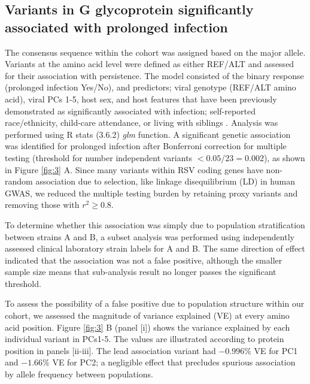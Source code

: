 \documentclass{article} %
\begin{document}
\subsection{Variants in G glycoprotein significantly associated with prolonged infection}
The consensus sequence within the cohort was assigned based on the major allele.
Variants at the amino acid level were defined as either REF/ALT and assessed for their association with persistence.
The model consisted of 
the binary response (prolonged infection Yes/No),
and predictors; viral genotype (REF/ALT amino acid), viral PCs 1-5, host sex, and host features that have been previously demonstrated as significantly associated with infection;
self-reported race/ethnicity, child-care attendance, or living with siblings
\cite{hall1976respiratory}.
Analysis was performed using R stats (3.6.2) \textit{glm} function. 
A significant genetic association was identified for prolonged infection after Bonferroni correction for multiple testing (threshold for number independent variants $< 0.05/23 = 0.002$), 
as shown in 
Figure \ref{fig:3} A. 
Since many variants within RSV coding genes have non-random association due to selection, like linkage disequilibrium (LD) in human GWAS, 
we reduced the multiple testing burden by retaining proxy variants and removing those with
$r^2 \ge 0.8$.

To determine whether this association was simply due to population stratification between strains A and B, a subset analysis was performed using independently assessed clinical laboratory strain labels for A and B.
The same direction of effect indicated that the association was not a false positive, although the smaller sample size means that sub-analysis result no longer passes the significant threshold. 

To assess the possibility of a false positive due to population structure within our cohort,
we assessed the magnitude of variance explained (VE) at every amino acid position.
Figure \ref{fig:3} B (panel [i]) shows the variance explained by each individual variant in PCs1-5.
The values are illustrated according to protein position in panels [ii-iii].
The lead association variant had 
$-0.996\%$ VE for PC1 and $-1.66\%$ VE for PC2; 
a negligible effect that precludes spurious association by allele frequency between populations.
\end{document}

